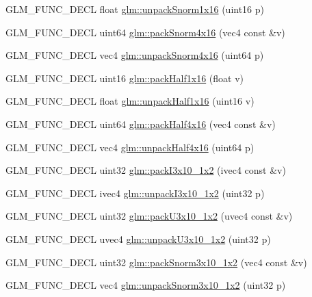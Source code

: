\begin{DoxyCompactItemize}
\item 
G\-L\-M\-\_\-\-F\-U\-N\-C\-\_\-\-D\-E\-C\-L float \hyperlink{group__gtc__packing_ga246f451cebf590726324f7a283e3d65e}{glm\-::unpack\-Snorm1x16} (uint16 p)
\item 
G\-L\-M\-\_\-\-F\-U\-N\-C\-\_\-\-D\-E\-C\-L uint64 \hyperlink{group__gtc__packing_ga9b237d7c66b7a71964e6d1f4dc06539f}{glm\-::pack\-Snorm4x16} (vec4 const \&v)
\item 
G\-L\-M\-\_\-\-F\-U\-N\-C\-\_\-\-D\-E\-C\-L vec4 \hyperlink{group__gtc__packing_ga1bfaa3f217fd7a4b6b9d3117ecb3fcac}{glm\-::unpack\-Snorm4x16} (uint64 p)
\item 
G\-L\-M\-\_\-\-F\-U\-N\-C\-\_\-\-D\-E\-C\-L uint16 \hyperlink{group__gtc__packing_gaba534b320836a35372e00af5771dd1a2}{glm\-::pack\-Half1x16} (float v)
\item 
G\-L\-M\-\_\-\-F\-U\-N\-C\-\_\-\-D\-E\-C\-L float \hyperlink{group__gtc__packing_gaa6eebcdfc746584b7d1823f1d5344fed}{glm\-::unpack\-Half1x16} (uint16 v)
\item 
G\-L\-M\-\_\-\-F\-U\-N\-C\-\_\-\-D\-E\-C\-L uint64 \hyperlink{group__gtc__packing_ga8104f0b719b7792491f2b789a6dd6f96}{glm\-::pack\-Half4x16} (vec4 const \&v)
\item 
G\-L\-M\-\_\-\-F\-U\-N\-C\-\_\-\-D\-E\-C\-L vec4 \hyperlink{group__gtc__packing_gaea526d6491ad40401eac34803984bf27}{glm\-::unpack\-Half4x16} (uint64 p)
\item 
G\-L\-M\-\_\-\-F\-U\-N\-C\-\_\-\-D\-E\-C\-L uint32 \hyperlink{group__gtc__packing_ga032e18fa5bc5b8f3897104aeb2f1e195}{glm\-::pack\-I3x10\-\_\-1x2} (ivec4 const \&v)
\item 
G\-L\-M\-\_\-\-F\-U\-N\-C\-\_\-\-D\-E\-C\-L ivec4 \hyperlink{group__gtc__packing_ga08bcd34cf9c34701d658dd861ee6e300}{glm\-::unpack\-I3x10\-\_\-1x2} (uint32 p)
\item 
G\-L\-M\-\_\-\-F\-U\-N\-C\-\_\-\-D\-E\-C\-L uint32 \hyperlink{group__gtc__packing_gaf656d8862628f96b20de7a36eaa1fe56}{glm\-::pack\-U3x10\-\_\-1x2} (uvec4 const \&v)
\item 
G\-L\-M\-\_\-\-F\-U\-N\-C\-\_\-\-D\-E\-C\-L uvec4 \hyperlink{group__gtc__packing_ga119aa2d7d55952f9dc4214390a6ffefc}{glm\-::unpack\-U3x10\-\_\-1x2} (uint32 p)
\item 
G\-L\-M\-\_\-\-F\-U\-N\-C\-\_\-\-D\-E\-C\-L uint32 \hyperlink{group__gtc__packing_ga0d4157cec37c0312216a7be1cc92df54}{glm\-::pack\-Snorm3x10\-\_\-1x2} (vec4 const \&v)
\item 
G\-L\-M\-\_\-\-F\-U\-N\-C\-\_\-\-D\-E\-C\-L vec4 \hyperlink{group__gtc__packing_ga8b8bb827a3743ca553d8702d3e337101}{glm\-::unpack\-Snorm3x10\-\_\-1x2} (uint32 p)

\end{DoxyCompactItemize}
